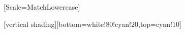\documentclass[10pt]{beamer}
\providecommand{\email}[1]{\texttt{#1}}
\newcommand{\GB}[1]{\colorbox{green}{#1}}
\newcommand{\BB}[1]{\colorbox{blue}{#1}}
\newcommand{\RB}[1]{\colorbox{red}{#1}}
\newcommand{\btprgsize}{\fontsize{7}{7}\selectfont}
\begin{document}
  \usepackage[T1]{fontenc}
  \usepackage[russian]{babel}
  \usepackage{lmodern}
\else
  \ifluatex
    \usepackage{unicode-math}
    \setsansfont{Linux Biolinum O}
    \setmonofont{Fira Mono}[Scale=MatchLowercase]
  \fi
\fi

[vertical shading][bottom=white!80!cyan!20,top=cyan!10]

\graphicspath{{pics/}}

\providecommand{\email}[1]{\texttt{#1}}
\usepackage{changepage}
\newcommand{\GB}[1]{\colorbox{green}{#1}}
\newcommand{\BB}[1]{\colorbox{blue}{#1}}
\newcommand{\RB}[1]{\colorbox{red}{#1}}
\newcommand{\btprgsize}{\fontsize{7}{7}\selectfont}

\end{document}
